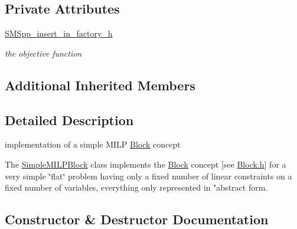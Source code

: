 \subsection*{Private Attributes}
\begin{DoxyCompactItemize}
\item 
\mbox{\label{class_s_m_spp__di__unipi__it_1_1_simple_m_i_l_p_block_a5618a1c2a09ff7cd62e4de9df7956672}} 
\mbox{\hyperlink{class_s_m_spp__di__unipi__it_1_1_simple_m_i_l_p_block_a5618a1c2a09ff7cd62e4de9df7956672}{S\+M\+Spp\+\_\+insert\+\_\+in\+\_\+factory\+\_\+h}}
\begin{DoxyCompactList}\small\item\em the objective function \end{DoxyCompactList}\end{DoxyCompactItemize}
\subsection*{Additional Inherited Members}


\subsection{Detailed Description}
implementation of a simple M\+I\+LP \mbox{\hyperlink{class_s_m_spp__di__unipi__it_1_1_block}{Block}} concept 

The \mbox{\hyperlink{class_s_m_spp__di__unipi__it_1_1_simple_m_i_l_p_block}{Simple\+M\+I\+L\+P\+Block}} class implements the \mbox{\hyperlink{class_s_m_spp__di__unipi__it_1_1_block}{Block}} concept \mbox{[}see \mbox{\hyperlink{_block_8h}{Block.\+h}}\mbox{]} for a very simple \char`\"{}flat\char`\"{} problem having only a fixed number of linear constraints on a fixed number of variables, everything only represented in "abstract form. 

\subsection{Constructor \& Destructor Documentation}
\mbox{\label{class_s_m_spp__di__unipi__it_1_1_simple_m_i_l_p_block_a1124eb498938a1d2097273b4be062e6f}} 
